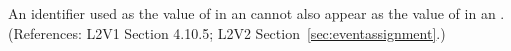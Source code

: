 An identifier used as the value of  in an \EventAssignment
cannot also appear as the value of  in an \AssignmentRule.
(References: L2V1 Section 4.10.5; L2V2 Section~\ref{sec:eventassignment}.)
